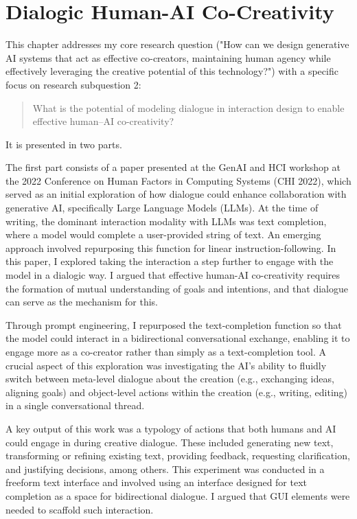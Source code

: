\chapter [Dialogic co-creativity]{Dialogic Human-AI Co-Creativity} \label{c:tc4}

This chapter addresses my core research question ("How can we design generative AI systems that act as effective co-creators, maintaining human agency while effectively leveraging the creative potential of this technology?") with a specific focus on research subquestion 2:
\begin{quote}
What is the potential of modeling dialogue in interaction design to enable effective human–AI co-creativity?
\end{quote}
It is presented in two parts.

The first part consists of a paper presented at the GenAI and HCI workshop at the 2022 Conference on Human Factors in Computing Systems (CHI 2022), which served as an initial exploration of how dialogue could enhance collaboration with generative AI, specifically Large Language Models (LLMs). At the time of writing, the dominant interaction modality with LLMs was text completion, where a model would complete a user-provided string of text. An emerging approach involved repurposing this function for linear instruction-following. In this paper, I explored taking the interaction a step further to engage with the model in a dialogic way. I argued that effective human-AI co-creativity requires the formation of mutual understanding of goals and intentions, and that dialogue can serve as the mechanism for this.

Through prompt engineering, I repurposed the text-completion function so that the model could interact in a bidirectional conversational exchange, enabling it to engage more as a co-creator rather than simply as a text-completion tool. A crucial aspect of this exploration was investigating the AI's ability to fluidly switch between meta-level dialogue about the creation (e.g., exchanging ideas, aligning goals) and object-level actions within the creation (e.g., writing, editing) in a single conversational thread.

A key output of this work was a typology of actions that both humans and AI could engage in during creative dialogue. These included generating new text, transforming or refining existing text, providing feedback, requesting clarification, and justifying decisions, among others.
This experiment was conducted in a freeform text interface and involved using an interface designed for text completion as a space for bidirectional dialogue. I argued that GUI elements were needed to scaffold such interaction.

